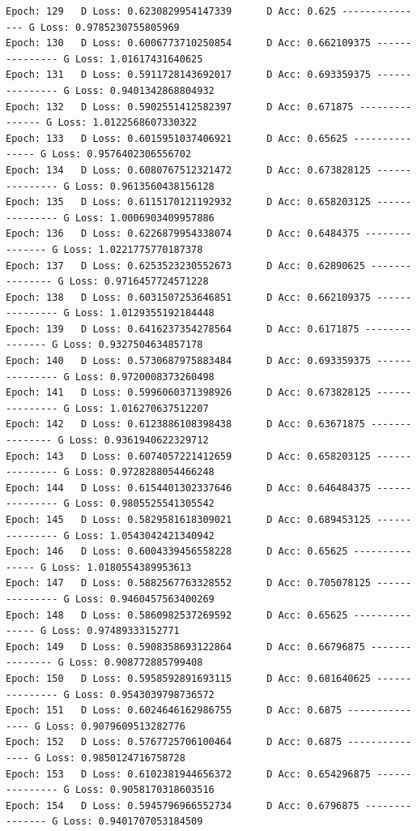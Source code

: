 \documentclass[11pt]{article}
\begin{document}
\begin{Verbatim}[commandchars=\\\{\}]
Epoch: 129 	 D Loss: 0.6230829954147339 	 D Acc: 0.625 --------------- G Loss: 0.9785230755805969
Epoch: 130 	 D Loss: 0.6006773710250854 	 D Acc: 0.662109375 --------------- G Loss: 1.01617431640625
Epoch: 131 	 D Loss: 0.5911728143692017 	 D Acc: 0.693359375 --------------- G Loss: 0.9401342868804932
Epoch: 132 	 D Loss: 0.5902551412582397 	 D Acc: 0.671875 --------------- G Loss: 1.0122568607330322
Epoch: 133 	 D Loss: 0.6015951037406921 	 D Acc: 0.65625 --------------- G Loss: 0.9576402306556702
Epoch: 134 	 D Loss: 0.6080767512321472 	 D Acc: 0.673828125 --------------- G Loss: 0.9613560438156128
Epoch: 135 	 D Loss: 0.6115170121192932 	 D Acc: 0.658203125 --------------- G Loss: 1.0006903409957886
Epoch: 136 	 D Loss: 0.6226879954338074 	 D Acc: 0.6484375 --------------- G Loss: 1.0221775770187378
Epoch: 137 	 D Loss: 0.6253523230552673 	 D Acc: 0.62890625 --------------- G Loss: 0.9716457724571228
Epoch: 138 	 D Loss: 0.6031507253646851 	 D Acc: 0.662109375 --------------- G Loss: 1.0129355192184448
Epoch: 139 	 D Loss: 0.6416237354278564 	 D Acc: 0.6171875 --------------- G Loss: 0.9327504634857178
Epoch: 140 	 D Loss: 0.5730687975883484 	 D Acc: 0.693359375 --------------- G Loss: 0.9720008373260498
Epoch: 141 	 D Loss: 0.5996060371398926 	 D Acc: 0.673828125 --------------- G Loss: 1.016270637512207
Epoch: 142 	 D Loss: 0.6123886108398438 	 D Acc: 0.63671875 --------------- G Loss: 0.9361940622329712
Epoch: 143 	 D Loss: 0.6074057221412659 	 D Acc: 0.658203125 --------------- G Loss: 0.9728288054466248
Epoch: 144 	 D Loss: 0.6154401302337646 	 D Acc: 0.646484375 --------------- G Loss: 0.9805525541305542
Epoch: 145 	 D Loss: 0.5829581618309021 	 D Acc: 0.689453125 --------------- G Loss: 1.0543042421340942
Epoch: 146 	 D Loss: 0.6004339456558228 	 D Acc: 0.65625 --------------- G Loss: 1.0180554389953613
Epoch: 147 	 D Loss: 0.5882567763328552 	 D Acc: 0.705078125 --------------- G Loss: 0.9460457563400269
Epoch: 148 	 D Loss: 0.5860982537269592 	 D Acc: 0.65625 --------------- G Loss: 0.97489333152771
Epoch: 149 	 D Loss: 0.5908358693122864 	 D Acc: 0.66796875 --------------- G Loss: 0.908772885799408
Epoch: 150 	 D Loss: 0.5958592891693115 	 D Acc: 0.681640625 --------------- G Loss: 0.9543039798736572
Epoch: 151 	 D Loss: 0.6024646162986755 	 D Acc: 0.6875 --------------- G Loss: 0.9079609513282776
Epoch: 152 	 D Loss: 0.5767725706100464 	 D Acc: 0.6875 --------------- G Loss: 0.9850124716758728
Epoch: 153 	 D Loss: 0.6102381944656372 	 D Acc: 0.654296875 --------------- G Loss: 0.9058170318603516
Epoch: 154 	 D Loss: 0.5945796966552734 	 D Acc: 0.6796875 --------------- G Loss: 0.9401707053184509

\end{Verbatim}
\end{document}
